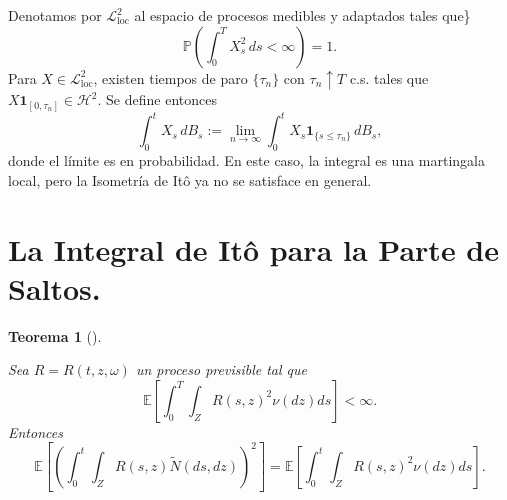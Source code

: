 \documentclass[
  spanish,
  us-letterpaper,
]{scrreprt}
\theoremstyle{plain}
\newtheorem{theorem}{Teorema}[chapter]
\theoremstyle{plain}
\theoremstyle{definition}
\theoremstyle{remark}
\begin{document}
Denotamos por \(\mathcal{L}^2_{\mathrm{loc}}\) al espacio de procesos
medibles y adaptados tales que\}
\[ \mathbb{P}\left( \int_0^T X_s^2 \, ds < \infty \right) = 1.\] Para
\(X \in \mathcal{L}^2_{\mathrm{loc}}\), existen tiempos de paro
\(\{\tau_n\}\) con \(\tau_n \uparrow T\) c.s. tales que
\(X \mathbf{1}_{[0,\tau_n]} \in \mathcal{H}^2\). Se define entonces
\[\int_0^t X_s \, dB_s := \lim_{n \to \infty} \int_0^t X_s \mathbf{1}_{\{s \leq \tau_n\}} \, dB_s,\]
donde el límite es en probabilidad. En este caso, la integral es una
martingala local, pero la Isometría de Itô ya no se satisface en
general.

\section{La Integral de Itô para la Parte de
Saltos.}\label{la-integral-de-ituxf4-para-la-parte-de-saltos.}

\begin{theorem}[]\protect\hypertarget{thm-Iso_Ito_saltos}{}\label{thm-Iso_Ito_saltos}

Sea \(R = R(t,z,\omega)\) un proceso previsible tal que
\[\mathbb{E}\left[ \int_0^T \int_Z R(s,z)^2 \nu(dz) ds \right] < \infty.\]
Entonces
\[\mathbb{E}\left[ \left( \int_0^t \int_Z R(s,z) \widetilde{N}(ds,dz) \right)^2 \right] = \mathbb{E}\left[ \int_0^t \int_Z R(s,z)^2 \nu(dz) ds \right].\]

\end{theorem}
\end{document}
